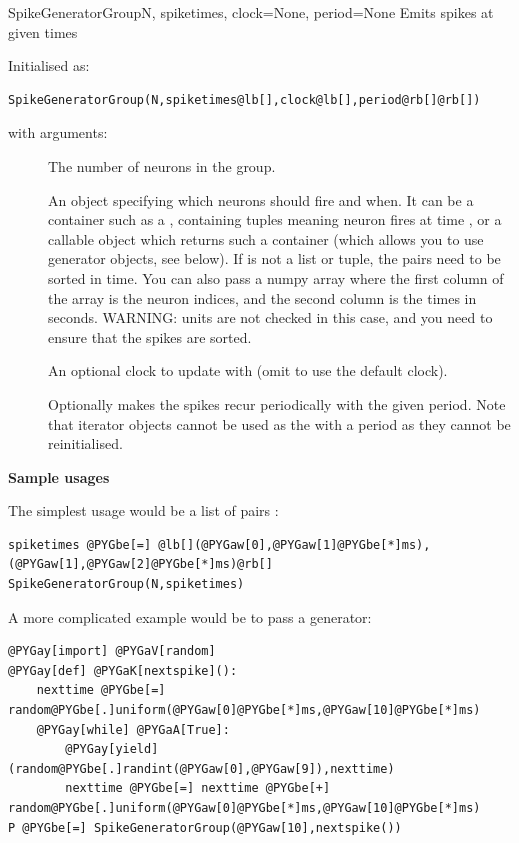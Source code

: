 \documentclass[letterpaper,10pt]{manual}
\begin{document}
\hypertarget{brian.SpikeGeneratorGroup}{}\begin{classdesc}{SpikeGeneratorGroup}{N, spiketimes, clock=None, period=None}
Emits spikes at given times

Initialised as:

\begin{Verbatim}[commandchars=@\[\]]
SpikeGeneratorGroup(N,spiketimes@lb[],clock@lb[],period@rb[]@rb[])
\end{Verbatim}

with arguments:
\begin{description}
\item[]
The number of neurons in the group.

\item[]
An object specifying which neurons should fire and when. It can be a container
such as a , containing tuples  meaning neuron  fires at
time , or a callable object which returns such a container (which
allows you to use generator objects, see below). If  is not
a list or tuple, the pairs  need to be sorted in time. You can
also pass a numpy array  where the first column of the
array is the neuron indices, and the second column is the times in
seconds. WARNING: units are not checked in this case, and you need to
ensure that the spikes are sorted.

\item[]
An optional clock to update with (omit to use the default clock).

\item[]
Optionally makes the spikes recur periodically with the given
period. Note that iterator objects cannot be used as the 
with a period as they cannot be reinitialised.

\end{description}

\textbf{Sample usages}

The simplest usage would be a list of pairs :

\begin{Verbatim}[commandchars=@\[\]]
spiketimes @PYGbe[=] @lb[](@PYGaw[0],@PYGaw[1]@PYGbe[*]ms), (@PYGaw[1],@PYGaw[2]@PYGbe[*]ms)@rb[]
SpikeGeneratorGroup(N,spiketimes)
\end{Verbatim}

A more complicated example would be to pass a generator:

\begin{Verbatim}[commandchars=@\[\]]
@PYGay[import] @PYGaV[random]
@PYGay[def] @PYGaK[nextspike]():
    nexttime @PYGbe[=] random@PYGbe[.]uniform(@PYGaw[0]@PYGbe[*]ms,@PYGaw[10]@PYGbe[*]ms)
    @PYGay[while] @PYGaA[True]:
        @PYGay[yield] (random@PYGbe[.]randint(@PYGaw[0],@PYGaw[9]),nexttime)
        nexttime @PYGbe[=] nexttime @PYGbe[+] random@PYGbe[.]uniform(@PYGaw[0]@PYGbe[*]ms,@PYGaw[10]@PYGbe[*]ms)
P @PYGbe[=] SpikeGeneratorGroup(@PYGaw[10],nextspike())
\end{Verbatim}


\end{classdesc}
\end{document}
